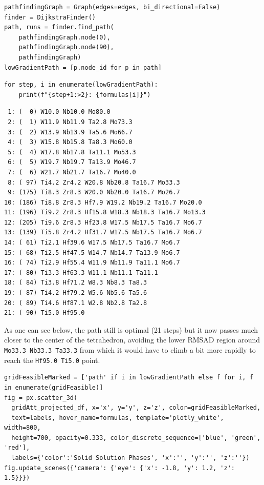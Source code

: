 \begin{verbatim}
pathfindingGraph = Graph(edges=edges, bi_directional=False)
finder = DijkstraFinder()
path, runs = finder.find_path(
    pathfindingGraph.node(0), 
    pathfindingGraph.node(90), 
    pathfindingGraph)
lowGradientPath = [p.node_id for p in path]
\end{verbatim}

\begin{verbatim}
for step, i in enumerate(lowGradientPath):
    print(f"{step+1:>2}: {formulas[i]}")
\end{verbatim}

\begin{verbatim}
 1: (  0) W10.0 Nb10.0 Mo80.0 
 2: (  1) W11.9 Nb11.9 Ta2.8 Mo73.3 
 3: (  2) W13.9 Nb13.9 Ta5.6 Mo66.7 
 4: (  3) W15.8 Nb15.8 Ta8.3 Mo60.0 
 5: (  4) W17.8 Nb17.8 Ta11.1 Mo53.3 
 6: (  5) W19.7 Nb19.7 Ta13.9 Mo46.7 
 7: (  6) W21.7 Nb21.7 Ta16.7 Mo40.0 
 8: ( 97) Ti4.2 Zr4.2 W20.8 Nb20.8 Ta16.7 Mo33.3 
 9: (175) Ti8.3 Zr8.3 W20.0 Nb20.0 Ta16.7 Mo26.7 
10: (186) Ti8.8 Zr8.3 Hf7.9 W19.2 Nb19.2 Ta16.7 Mo20.0 
11: (196) Ti9.2 Zr8.3 Hf15.8 W18.3 Nb18.3 Ta16.7 Mo13.3 
12: (205) Ti9.6 Zr8.3 Hf23.8 W17.5 Nb17.5 Ta16.7 Mo6.7 
13: (139) Ti5.8 Zr4.2 Hf31.7 W17.5 Nb17.5 Ta16.7 Mo6.7 
14: ( 61) Ti2.1 Hf39.6 W17.5 Nb17.5 Ta16.7 Mo6.7 
15: ( 68) Ti2.5 Hf47.5 W14.7 Nb14.7 Ta13.9 Mo6.7 
16: ( 74) Ti2.9 Hf55.4 W11.9 Nb11.9 Ta11.1 Mo6.7 
17: ( 80) Ti3.3 Hf63.3 W11.1 Nb11.1 Ta11.1 
18: ( 84) Ti3.8 Hf71.2 W8.3 Nb8.3 Ta8.3 
19: ( 87) Ti4.2 Hf79.2 W5.6 Nb5.6 Ta5.6 
20: ( 89) Ti4.6 Hf87.1 W2.8 Nb2.8 Ta2.8 
21: ( 90) Ti5.0 Hf95.0 
\end{verbatim}

As one can see below, the path still is optimal (21 steps) but it now
passes much closer to the center of the tetrahedron, avoiding the lower
RMSAD region around \texttt{Mo33.3 Nb33.3 Ta33.3} from
which it would have to climb a bit more rapidly to reach the
\texttt{Hf95.0 Ti5.0} point.

\begin{verbatim}
gridFeasibleMarked = ['path' if i in lowGradientPath else f for i, f in enumerate(gridFeasible)]
fig = px.scatter_3d(
  gridAtt_projected_df, x='x', y='y', z='z', color=gridFeasibleMarked, 
  text=labels, hover_name=formulas, template='plotly_white', width=800, 
  height=700, opacity=0.333, color_discrete_sequence=['blue', 'green', 'red'],
  labels={'color':'Solid Solution Phases', 'x':'', 'y':'', 'z':''})
fig.update_scenes({'camera': {'eye': {'x': -1.8, 'y': 1.2, 'z': 1.5}}})
\end{verbatim}

